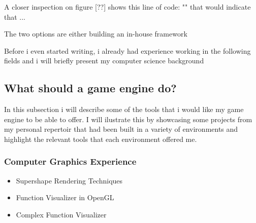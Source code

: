         A closer inspection on figure [??] shows this line of code: "" that would indicate that ...



        The two options are either building an in-house framework 

        Before i even started writing, i already had experience working in the following fields and i will briefly present my computer science background



        \subsection{What should a game engine do?}
            In this subsection i will describe some of the tools that i would like my game engine to be able to offer.
            I will ilustrate this by showcasing some projects from my personal repertoir that had been built in a variety of environments and highlight the relevant tools that each environment offered me.

            \subsubsection{Computer Graphics Experience}
                \begin{itemize} 
                    \item Supershape Rendering Techniques 
                    \item Function Visualizer in OpenGL 
                    \item Complex Function Visualizer 
                \end{itemize}

